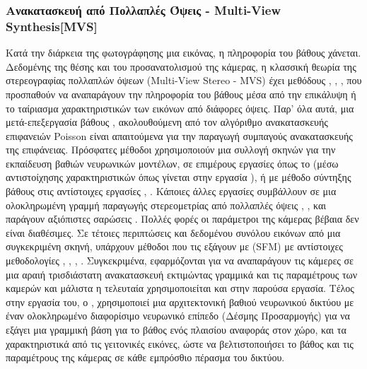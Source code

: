      
\subsubsection{Ανακατασκευή από Πολλαπλές Όψεις - Multi-View Synthesis[MVS]} 
\par     
    Κατά την διάρκεια της φωτογράφησης μια εικόνας, η πληροφορία του βάθους χάνεται. Δεδομένης της θέσης και του προσανατολισμού της κάμερας, η κλασσική θεωρία της στερεογραφίας πολλαπλών όψεων (Multi-View Stereo - MVS) έχει μεθόδους \cite{5226635}, \cite{schonberger2016pixelwise}, \cite{campbell2008using}, \cite{tola2012efficient} που προσπαθούν να αναπαράγουν την πληροφορία του βάθους μέσα από την επικάλυψη ή το ταίριασμα χαρακτηριστικών των εικόνων από διάφορες όψεις. Παρ' όλα αυτά, μια μετά-επεξεργασία βάθους  \cite{curless1996volumetric}, \cite{merrell2007real} ακολουθούμενη από τον αλγόριθμο ανακατασκευής επιφανειών Poisson \cite{kazhdan2006poisson} είναι απαιτούμενα για την παραγωγή συμπαγούς ανακατασκευής της επιφάνειας. Πρόσφατες μέθοδοι χρησιμοποιούν μια συλλογή σκηνών για την εκπαίδευση βαθιών νευρωνικών μοντέλων, σε επιμέρους εργασίες όπως το  (μέσω  αντιστοίχησης χαρακτηριστικών όπως γίνεται στην εργασία \cite{leroy2018shape}), ή με μέθοδο σύντηξης βάθους  στις αντίστοιχες εργασίες \cite{donne2019learning}, \cite{riegler2017octnetfusion}. Κάποιες άλλες εργασίες συμβάλλουν σε μια ολοκληρωμένη γραμμή παραγωγής στερεομετρίας από πολλαπλές όψεις \cite{huang2018deepmvs}, \cite{yao2018mvsnet}, \cite{yao2019recurrent} και παράγουν αξιόπιστες σαρώσεις . Πολλές φορές οι παράμετροι της κάμερας βέβαια δεν είναι διαθέσιμες. Σε τέτοιες περιπτώσεις και δεδομένου συνόλου εικόνων από μια συγκεκριμένη σκηνή, υπάρχουν μέθοδοι που τις εξάγουν με  (SFM) με αντίστοιχες μεθοδολογίες \cite{snavely2006photo}, \cite{schonberger2016structure}, \cite{kasten2019algebraic}, \cite{jiang2013global}.  Συγκεκριμένα, εφαρμόζονται για να αναπαράγουν τις κάμερες σε μια αραιή τρισδιάστατη ανακατασκευή εκτιμώντας γραμμικά και τις παραμέτρους των καμερών και μάλιστα η τελευταία χρησιμοποιείται και στην παρούσα εργασία. Τέλος στην εργασία του, ο  \cite{tang2018ba}, χρησιμοποιεί μια αρχιτεκτονική βαθιού νευρωνικού δικτύου με έναν ολοκληρωμένο διαφορίσιμο νευρωνικό επίπεδο  \cite{triggs2000bundle} (Δέσμης Προσαρμογής) για να εξάγει μια γραμμική βάση για το βάθος ενός πλαισίου αναφοράς στον χώρο, και τα χαρακτηριστικά από τις γειτονικές εικόνες, ώστε να βελτιστοποιήσει  το βάθος και τις παραμέτρους της κάμερας σε κάθε εμπρόσθιο πέρασμα του δικτύου. 
    
